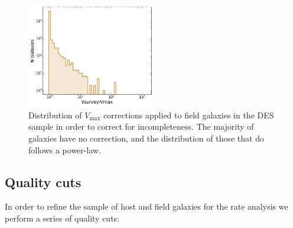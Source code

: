 \documentclass[fleqn,usenatbib]{mnras}
\begin{document}
\begin{figure}
    \centering
    \includegraphics[width=0.5\textwidth]{figs/field_vmax.png}
    \caption{Distribution of $V_{\mathrm{max}}$ corrections applied to field galaxies in the DES sample in order to correct for incompleteness. The majority of galaxies have no correction, and the distribution of those that do follows a power-law.
    \label{fig:vmax_field}}
\end{figure}

\subsection{Quality cuts \label{subsec:cuts}}

In order to refine the sample of host and field galaxies for the rate analysis we perform a series of quality cuts:
\end{document}
